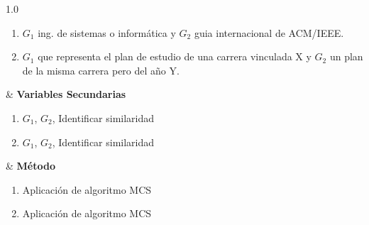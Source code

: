 \begin{table}[h]
\begin{tabularx}{1.0\textwidth}
\begin{enumerate}[wide, labelwidth=!, labelindent=0pt]
\item $G_1$ ing. de sistemas o informática y $G_2$ guia internacional de ACM/IEEE.
\item $G_1$ que representa el plan de estudio de una carrera vinculada X y $G_2$ un plan de la misma carrera pero del año Y. 
\end{enumerate}&
\scriptsize
\textbf{Variables Secundarias}\break
\begin{enumerate}[wide, labelwidth=!, labelindent=0pt]
\item $G_1$, $G_2$, Identificar similaridad
\item $G_1$, $G_2$, Identificar similaridad
\end{enumerate}&
\scriptsize
\textbf{Método}\break
\begin{enumerate}[wide, labelwidth=!, labelindent=0pt]
\item Aplicación de algoritmo MCS
\item Aplicación de algoritmo MCS
\end{enumerate}\\
\hline
\end{tabularx}
\label{tab:matcon}
\end{table}
